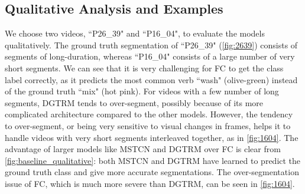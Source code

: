 \subsection{Qualitative Analysis and Examples}

We choose two videos, ``P26\_39" and ``P16\_04", to evaluate the models qualitatively. The ground truth segmentation of ``P26\_39" (\ref{fig:2639}) consists of segments of long-duration, whereas ``P16\_04" consists of a large number of very short segments. We can see that it is very challenging for FC to get the class label correctly, as it predicts the most common verb ``wash" (olive-green) instead of the ground truth ``mix" (hot pink). For videos with a few number of long segments, DGTRM tends to over-segment, possibly because of its more complicated architecture compared to the other models. However, the tendency to over-segment, or being very sensitive to visual changes in frames, helps it to handle videos with very short segments interleaved together, as in \ref{fig:1604}. The advantage of larger models like MSTCN and DGTRM over FC is clear from \ref{fig:baseline_qualitative}: both MSTCN and DGTRM have learned to predict the ground truth class and give more accurate segmentations. The over-segmentation issue of FC, which is much more severe than DGTRM, can be seen in \ref{fig:1604}.

